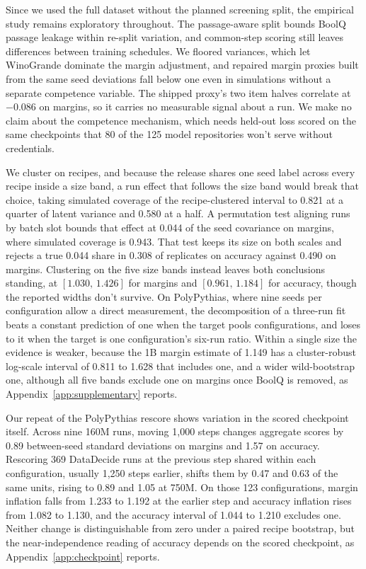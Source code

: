 \documentclass{article}
\newcommand{\ci}[2]{\ensuremath{[#1,\,#2]}}
\begin{document}
Since we used the full dataset without the planned screening split, the empirical study remains exploratory throughout. The passage-aware split bounds BoolQ passage leakage within re-split variation, and common-step scoring still leaves differences between training schedules. We floored variances, which let WinoGrande dominate the margin adjustment, and repaired margin proxies built from the same seed deviations fall below one even in simulations without a separate competence variable. The shipped proxy's two item halves correlate at $-0.086$ on margins, so it carries no measurable signal about a run. We make no claim about the competence mechanism, which needs held-out loss scored on the same checkpoints that 80 of the 125 model repositories won't serve without credentials.

We cluster on recipes, and because the release shares one seed label across every recipe inside a size band, a run effect that follows the size band would break that choice, taking simulated coverage of the recipe-clustered interval to 0.821 at a quarter of latent variance and 0.580 at a half. A permutation test aligning runs by batch slot bounds that effect at 0.044 of the seed covariance on margins, where simulated coverage is 0.943. That test keeps its size on both scales and rejects a true 0.044 share in 0.308 of replicates on accuracy against 0.490 on margins. Clustering on the five size bands instead leaves both conclusions standing, at \ci{1.030}{1.426} for margins and \ci{0.961}{1.184} for accuracy, though the reported widths don't survive. On PolyPythias, where nine seeds per configuration allow a direct measurement, the decomposition of a three-run fit beats a constant prediction of one when the target pools configurations, and loses to it when the target is one configuration's six-run ratio. Within a single size the evidence is weaker, because the 1B margin estimate of 1.149 has a cluster-robust log-scale interval of 0.811 to 1.628 that includes one, and a wider wild-bootstrap one, although all five bands exclude one on margins once BoolQ is removed, as Appendix~\ref{app:supplementary} reports.

Our repeat of the PolyPythias rescore shows variation in the scored checkpoint itself. Across nine 160M runs, moving 1,000 steps changes aggregate scores by 0.89 between-seed standard deviations on margins and 1.57 on accuracy. Rescoring 369 DataDecide runs at the previous step shared within each configuration, usually 1,250 steps earlier, shifts them by 0.47 and 0.63 of the same units, rising to 0.89 and 1.05 at 750M. On those 123 configurations, margin inflation falls from 1.233 to 1.192 at the earlier step and accuracy inflation rises from 1.082 to 1.130, and the accuracy interval of 1.044 to 1.210 excludes one. Neither change is distinguishable from zero under a paired recipe bootstrap, but the near-independence reading of accuracy depends on the scored checkpoint, as Appendix~\ref{app:checkpoint} reports.
\end{document}
